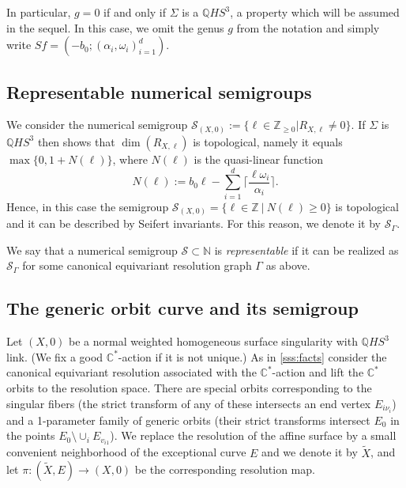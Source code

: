 \documentclass[12pt,a4paper]{amsart}
\def\cS{{\mathcal S}}
\theoremstyle{remark}
\theoremstyle{definition}
\begin{document}
In particular, $g=0$ if and only if $\Sigma$ is a $\mathbb{Q}HS^3$, a property which will be assumed in the sequel. In this case, we omit the genus $g$ from the notation and simply write $Sf=(-b_0;(\alpha_i,\omega_i)_{i=1}^d)$.

\subsection{\bf Representable numerical semigroups \cite{stronglyflat,flat}}\label{ss:4.2}
We consider the numerical semigroup $\mathcal{S}_{(X,0)}:=\{\ell\in\mathbb{Z}_{\geq 0} | R_{X,\ell}\neq 0\}$. 
If  $\Sigma$ is $\mathbb{Q}HS^3$ then  \cite{pinkham} shows  that $\dim(R_{X,\ell})$ is 
topological, namely it equals 
$\max\{0,1+N(\ell)\}$, where $N(\ell)$
is  the quasi-linear function 
\begin{equation}\label{defN}
N(\ell):=b_0\ell-\sum_{i=1}^d\Big\lceil \frac{\ell \omega_i}{\alpha_i}\Big\rceil.
\end{equation}
Hence, in this case the semigroup $\cS_{(X,0)}=\{\ell\in\mathbb{Z} \ | \ N(\ell)\geq 0\}$ is topological and it can be  described by Seifert invariants.  
For this reason, we denote it by $\cS_{\Gamma}$. 

We say that a numerical semigroup $\cS\subset \mathbb{N}$ is {\it representable} if it can be realized as $\cS_\Gamma$ for some canonical equivariant resolution graph $\Gamma$  as above. 

\subsection{The generic orbit curve and its semigroup}

Let $(X,0)$ be a normal weighted homogeneous surface singularity with $\mathbb{Q}HS^3$ link. (We fix a good $\mathbb{C}^*$-action if it is not unique.) As in \ref{sss:facts} consider the canonical equivariant resolution associated with the $\mathbb{C}^*$-action and lift the $\mathbb{C}^*$ orbits to the resolution space. There are special orbits corresponding to the singular fibers (the strict transform of any of these  intersects an  
end vertex $E_{i\nu_i}$)  and a 1-parameter family of generic orbits 
(their strict transforms intersect $E_0$ in the points 
$E_0\setminus \cup_i E_{v_{i1}}$). We replace the resolution of the affine 
surface by a small convenient neighborhood of the exceptional curve $E$ and we denote it by $\widetilde X$,  and let $\pi:(\widetilde X,E) \to (X,0)$ be the 
corresponding resolution map. 
\end{document}
